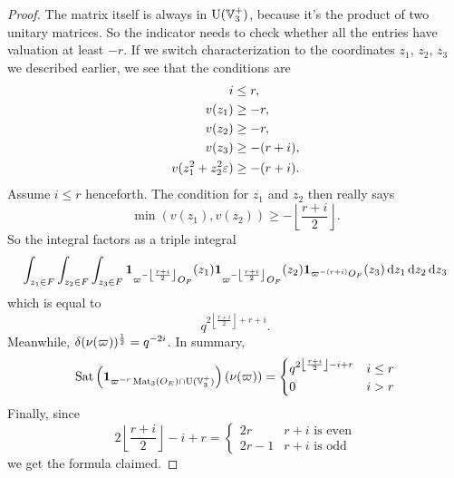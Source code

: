 \begin{proof}
  The matrix itself is always in $\operatorname{U}(\mathbb V_3^+)$, because it's the product of two unitary matrices.
  So the indicator needs to check whether all the entries have valuation at least $-r$.
  If we switch characterization to the coordinates $z_1$, $z_2$, $z_3$ we described earlier,
  we see that the conditions are
  \begin{align*}
    i &\le r, \\
    v(z_1) &\ge -r, \\
    v(z_2) &\ge -r,\\
    v(z_3) &\ge -(r+i),\\
    v(z_1^2 + z_2^2 \varepsilon) &\ge -(r+i).
  \end{align*}
  Assume $i \le r$ henceforth.
  The condition for $z_1$ and $z_2$ then really says
  \[ \min(v(z_1), v(z_2)) \ge -\left\lfloor \frac{r+i}{2} \right\rfloor. \]
  So the integral factors as a triple integral
  \[
    \int_{z_1 \in F}
    \int_{z_2 \in F}
    \int_{z_3 \in F}
    \mathbf{1}_{\varpi^{-\left\lfloor \frac{r+i}{2} \right\rfloor} \OO_F}(z_1)
    \mathbf{1}_{\varpi^{-\left\lfloor \frac{r+i}{2} \right\rfloor} \OO_F}(z_2)
    \mathbf{1}_{\varpi^{-(r+i)} \OO_F}(z_3)
    \odif{z_1,z_2,z_3}
  \]
  which is equal to
  \[ q^{2\left\lfloor \frac{r+i}{2} \right\rfloor+r+i}. \]
  Meanwhile, $\delta(\nu(\varpi))^{\frac{1}{2}} = q^{-2i}$.
  In summary,
  \[
    \operatorname{Sat}\left( \mathbf{1}_{\varpi^{-r} \operatorname{Mat}_3(O_E) \cap \operatorname{U}(\mathbb V_3^+)}\right) \left( \nu(\varpi) \right)
    =
    \begin{cases}
      q^{2\left\lfloor \frac{r+i}{2} \right\rfloor - i + r} & i \le r \\
      0 & i > r
    \end{cases}
  \]
  Finally, since
  \[ 2\left\lfloor \frac{r+i}{2} \right\rfloor - i + r
    = \begin{cases}
      2r & r+i \text{ is even} \\
      2r-1 & r+i \text{ is odd}
    \end{cases}
  \]
  we get the formula claimed.
\end{proof}

